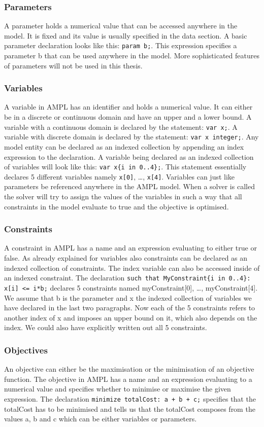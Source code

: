 \subsubsection{Parameters}
A parameter holds a numerical value that can be accessed anywhere in the model. It is fixed and its value is usually specified in the data section. A basic parameter declaration looks like this: \verb=param b;=. This expression specifies a parameter b that can be used anywhere in the model. More sophisticated features of parameters will not be used in this thesis.
\subsubsection{Variables}
A variable in AMPL has an identifier and holds a numerical value. It can either be in a discrete or continuous domain and have an upper and a lower bound. A variable with a continuous domain is declared by the statement: \verb=var x;=. A variable with discrete domain is declared by the statement: \verb=var x integer;=. Any model entity can be declared as an indexed collection by appending an index expression to the declaration. A variable being declared as an indexed collection of variables will look like this: \verb=var x{i in 0..4};=. This statement essentially declares 5 different variables namely \verb=x[0]=, \ldots , \verb=x[4]=. Variables can just like parameters be referenced anywhere in the AMPL model. When a solver is called the solver will try to assign the values of the variables in such a way that all constraints in the model evaluate to true and the objective is optimised.
\subsubsection{Constraints}
A constraint in AMPL has a name and an expression evaluating to either true or false. As already explained for variables also constraints can be declared as an indexed collection of constraints. The index variable can also be accessed inside of an indexed constraint. The declaration \verb&such that MyConstraint{i in 0..4}: x[i] <= i*b;& declares 5 constraints named myConstraint[0], \ldots, myConstraint[4]. We assume that b is the parameter and x the indexed collection of variables we have declared in the last two paragraphs. Now each of the 5 constraints refers to another index of x and imposes an upper bound on it, which also depends on the index. We could also have explicitly written out all 5 constraints.
\subsubsection{Objectives}
An objective can either be the maximisation or the minimisation of an objective function. The objective in AMPL has a name and an expression evaluating to a numerical value and specifies whether to minimise or maximise the given expression. The declaration \verb&minimize totalCost: a + b + c;& specifies that the totalCost has to be minimised and tells us that the totalCost composes from the values a, b and c which can be either variables or parameters. 
